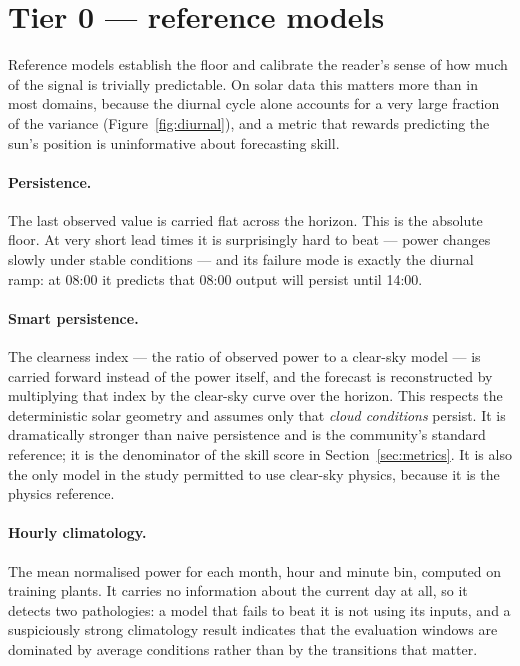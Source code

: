 \section{Tier 0 --- reference models}
\label{sec:tier0}

Reference models establish the floor and calibrate the reader's sense of how much of the
signal is trivially predictable. On solar data this matters more than in most domains,
because the diurnal cycle alone accounts for a very large fraction of the variance
(Figure~\ref{fig:diurnal}), and a metric that rewards predicting the sun's position is
uninformative about forecasting skill.

\paragraph{Persistence.} The last observed value is carried flat across the horizon. This is
the absolute floor. At very short lead times it is surprisingly hard to beat --- power
changes slowly under stable conditions --- and its failure mode is exactly the diurnal
ramp: at 08:00 it predicts that 08:00 output will persist until 14:00.

\paragraph{Smart persistence.} The clearness index --- the ratio of observed power to a
clear-sky model --- is carried forward instead of the power itself, and the forecast is
reconstructed by multiplying that index by the clear-sky curve over the horizon. This
respects the deterministic solar geometry and assumes only that \emph{cloud conditions}
persist. It is dramatically stronger than naive persistence and is the community's standard
reference; it is the denominator of the skill score in Section~\ref{sec:metrics}. It is also
the only model in the study permitted to use clear-sky physics, because it is the physics
reference.

\paragraph{Hourly climatology.} The mean normalised power for each month, hour and minute
bin, computed on training plants. It carries no information about the current day at all,
so it detects two pathologies: a model that fails to beat it is not using its inputs, and a
suspiciously strong climatology result indicates that the evaluation windows are dominated
by average conditions rather than by the transitions that matter.

